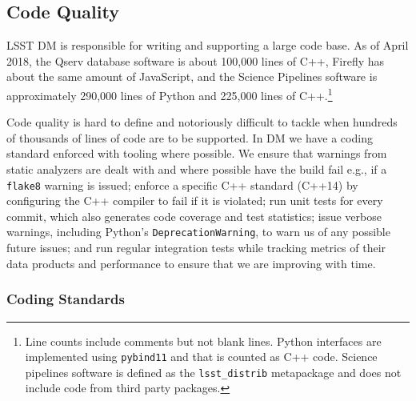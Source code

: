 \subsection{Code Quality}

LSST DM is responsible for writing and supporting a large code base.
As of April 2018, the Qserv database software\cite{2011Wang:2011:QDS:2063348.2063364} is about 100,000 lines of C++, Firefly has about the same amount of JavaScript\cite{2016SPIE.9913E..0YR}, and the Science Pipelines software\cite{2018PASJ...70S...5B} is approximately 290,000 lines of Python and 225,000 lines of C++.\footnote{Line counts include comments but not blank lines. Python interfaces are implemented using \texttt{pybind11} and that is counted as C++ code. Science pipelines software is defined as the \texttt{lsst\_distrib} metapackage and does not include code from third party packages.}

%

Code quality is hard to define and notoriously difficult to tackle when hundreds of thousands of lines of code are to be supported.
In DM we have a coding standard\cite{devguide} enforced with tooling where possible.
We ensure  that warnings from static analyzers are dealt with and where possible have the build fail e.g., if a \texttt{flake8} warning is issued;
enforce a specific C++ standard (C++14) by configuring the C++ compiler to fail if it is violated;
run unit tests for every commit, which also generates code coverage and test statistics;
issue verbose warnings, including Python's \texttt{DeprecationWarning}, to warn us of any possible future issues;
and run regular integration tests while tracking metrics of their data products and performance to ensure that we are improving with time.

\subsubsection{Coding Standards}
\label{sec:coding-standards}

